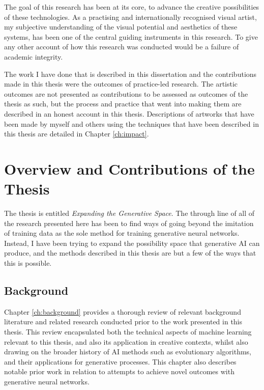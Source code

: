 The goal of this research has been at its core, to advance the creative possibilities of these technologies. 
As a practising and internationally recognised visual artist, my subjective understanding of the visual potential and aesthetics of these systems, has been one of the central guiding instruments in this research. 
To give any other account of how this research was conducted would be a failure of academic integrity. 

The work  I have done that is described in this dissertation and the contributions made in this thesis were the outcomes of practice-led research. 
The artistic outcomes are not presented as contributions to be assessed as outcomes of the thesis as such, but the process and practice that went into making them are described in an honest account in this thesis. 
Descriptions of artworks that have been made by myself and others using the techniques that have been described in this thesis are detailed in Chapter \ref{ch:impact}.

\section{Overview and Contributions of the Thesis}

The thesis is entitled \textit{Expanding the Generative Space}. 
The through line of all of the research presented here has been to find ways of going beyond the imitation of training data as the sole method for training generative neural networks. 
Instead, I have been trying to expand the possibility space that generative AI can produce, and the methods described in this thesis are but a few of the ways that this is possible. 

\subsection{Background}

Chapter \ref{ch:background} provides a thorough review of relevant background literature and related research conducted prior to the work presented in this thesis.
This review encapsulated both the technical aspects of machine learning relevant to this thesis, and also its application in creative contexts, whilst also drawing on the broader history of AI methods such as evolutionary algorithms, and their applications for generative processes. 
This chapter also describes notable prior work in relation to attempts to achieve novel outcomes with generative neural networks.

